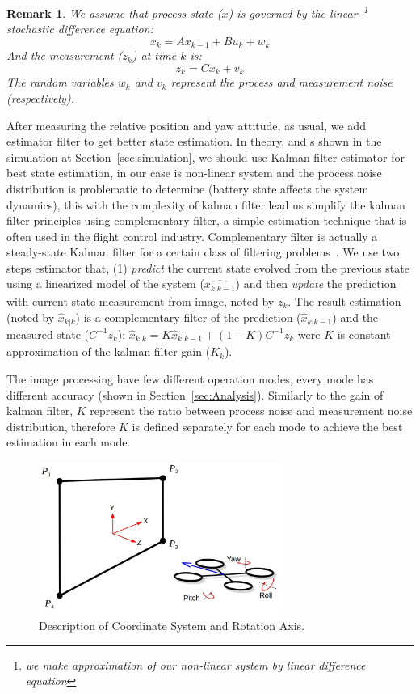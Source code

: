 \documentclass{sig-alternate-ipsn13}
\newtheorem{remark}{Remark}
\begin{document}
\begin{remark}
    We assume that process state ($x$) is governed by the linear~\footnote{we make approximation of our non-linear system by linear difference equation} stochastic difference equation:
    $$x_{k}=Ax_{k-1} + Bu_{k} + w_{k}$$
    And the measurement ($z_k$) at time $k$ is:
    $$z_k=Cx_k+v_k$$
    The random variables $w_k$ and $v_k$ represent the process and measurement noise (respectively).
\end{remark}

After measuring the relative position and yaw attitude, as usual, we add estimator filter to get better state estimation. 
In theory, and s shown in the simulation at Section~\ref{sec:simulation}, we should use Kalman filter estimator for best state estimation, in our case is non-linear system and the process noise distribution is problematic to determine (battery state affects the system dynamics), this with the complexity of kalman filter lead us simplify the kalman filter principles using complementary filter, a simple estimation technique that is often used in the flight control industry.
Complementary filter is actually a steady-state Kalman filter for a certain class of filtering problems~\cite{complementaryVSKalman}.
We use two steps estimator that, (1) \textit{predict} the current state evolved from the previous state using a linearized model of the system ($\hat{x_{k|k-1}}$) and then \textit{update} the prediction with current state measurement from image, noted by $z_k$.
The result estimation (noted by $\hat{x}_{k|k}$) is a complementary filter of the prediction ($\hat{x}_{k|k-1}$) and the measured state ($C^{-1}z_k$):
$ \hat{x}_{k|k} = K \hat{x}_{k|k-1} + (1-K) C^{-1}z_k $ were $K$ is constant approximation of the kalman filter gain ($K_k$).

The image processing have few different operation modes, every mode has different accuracy (shown in Section~\ref{sec:Analysis}).
Similarly to the gain of kalman filter, $K$ represent the ratio between process noise and measurement noise distribution, therefore $K$ is defined separately for each mode to achieve the best estimation in each mode.

\begin{figure}[htbp]
    \centerline{\includegraphics[width=80mm]{axis.jpg}}
    \caption{Description of Coordinate System and Rotation Axis.}
    \label{fig:axis}
\end{figure}
\end{document}
